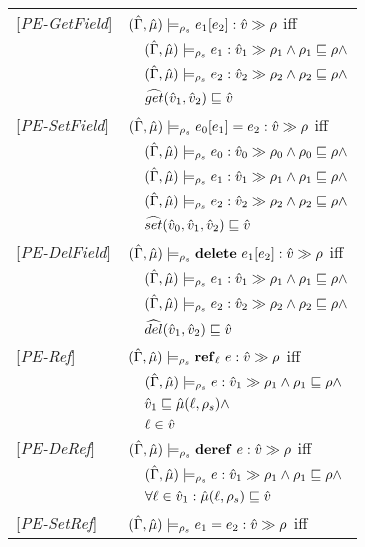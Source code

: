 \begin{table}[tlb]
\begin{tabular} {l l l l}
{[\textit{PE-GetField}]}&\multicolumn{3}{l}{$(\hat{\Gamma},\hat{\mu}) \models_{\rho_s} e_1[e_2] : \hat{v} \gg \rho $ iff}\\
&&\multicolumn{2}{l}{$ (\hat{\Gamma},\hat{\mu}) \models_{\rho_s} e_1 : \hat{v}_{1} \gg \rho_{1} \wedge \rho_1 \sqsubseteq \rho \wedge$}\\
&&\multicolumn{2}{l}{$ (\hat{\Gamma},\hat{\mu}) \models_{\rho_s} e_2 : \hat{v}_{2} \gg \rho_{2} \wedge \rho_2 \sqsubseteq \rho \wedge$} \\
&&\multicolumn{2}{l}{$\widehat{get} (\hat{v}_1, \hat{v}_2) \sqsubseteq \hat{v}$} \\
{[\textit{PE-SetField}]}&\multicolumn{3}{l}{$(\hat{\Gamma},\hat{\mu}) \models_{\rho_s} e_0[e_1] = e_2 : \hat{v} \gg \rho $ iff}\\
&&\multicolumn{2}{l}{$ (\hat{\Gamma},\hat{\mu}) \models_{\rho_s} e_0 : \hat{v}_{0} \gg \rho_{0} \wedge \rho_0 \sqsubseteq \rho \wedge$}\\
&&\multicolumn{2}{l}{$ (\hat{\Gamma},\hat{\mu}) \models_{\rho_s} e_1 : \hat{v}_{1} \gg \rho_{1} \wedge \rho_1 \sqsubseteq \rho \wedge$} \\
&&\multicolumn{2}{l}{$ (\hat{\Gamma},\hat{\mu}) \models_{\rho_s} e_2 : \hat{v}_{2} \gg \rho_{2} \wedge \rho_2 \sqsubseteq \rho \wedge$} \\
&&\multicolumn{2}{l}{$\widehat{set} (\hat{v}_0, \hat{v}_1, \hat{v}_2) \sqsubseteq \hat{v}$} \\
{[\textit{PE-DelField}]}&\multicolumn{3}{l}{$(\hat{\Gamma},\hat{\mu}) \models_{\rho_s} \mathbf{delete}\ e_1[e_2] : \hat{v} \gg \rho $ iff}\\
&&\multicolumn{2}{l}{$ (\hat{\Gamma},\hat{\mu}) \models_{\rho_s} e_1 : \hat{v}_{1} \gg \rho_{1} \wedge \rho_1 \sqsubseteq \rho \wedge$}\\
&&\multicolumn{2}{l}{$ (\hat{\Gamma},\hat{\mu}) \models_{\rho_s} e_2 : \hat{v}_{2} \gg \rho_{2} \wedge \rho_2 \sqsubseteq \rho \wedge$} \\
&&\multicolumn{2}{l}{$\widehat{del} (\hat{v}_1, \hat{v}_2) \sqsubseteq \hat{v}$}\\
{[\textit{PE-Ref}]}&\multicolumn{3}{l}{$ (\hat{\Gamma},\hat{\mu}) \models_{\rho_s} \mathbf{ref}_{\ell}\ e : \hat{v} \gg \rho$ iff}\\
&&\multicolumn{2}{l}{$ (\hat{\Gamma},\hat{\mu}) \models_{\rho_s} e : \hat{v}_{1} \gg \rho_{1} \wedge \rho_1 \sqsubseteq \rho\wedge$}\\
&&\multicolumn{2}{l}{$\hat{v}_1 \sqsubseteq \hat{\mu}(\ell, \rho_s) \wedge $} \\
&&\multicolumn{2}{l}{$\ell \in \hat{v}$} \\
{[\textit{PE-DeRef}]}&\multicolumn{3}{l}{$(\hat{\Gamma},\hat{\mu}) \models_{\rho_s} \mathbf{deref}\ e : \hat{v} \gg \rho $ iff}\\
&&\multicolumn{2}{l}{$(\hat{\Gamma},\hat{\mu}) \models_{\rho_s} e : \hat{v}_{1} \gg \rho_{1} \wedge \rho_1 \sqsubseteq \rho \wedge$}\\
&&\multicolumn{2}{l}{$\forall \ell \in \hat{v}_1 : \hat{\mu}(\ell, \rho_s) \sqsubseteq \hat{v}$ }\\
{[\textit{PE-SetRef}]}&\multicolumn{3}{l}{$(\hat{\Gamma},\hat{\mu}) \models_{\rho_s} e_1 = e_2 : \hat{v} \gg \rho $ iff}\\

\end{tabular}
\end{table}
